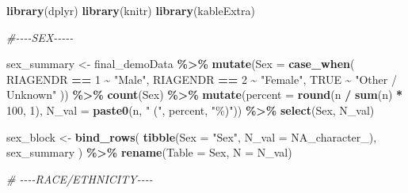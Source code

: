 \documentclass[
]{article}
\newenvironment{Shaded}{\begin{snugshade}}{\end{snugshade}}
\newcommand{\AttributeTok}[1]{\textcolor[rgb]{0.13,0.29,0.53}{#1}}
\newcommand{\CommentTok}[1]{\textcolor[rgb]{0.56,0.35,0.01}{\textit{#1}}}
\newcommand{\ConstantTok}[1]{\textcolor[rgb]{0.56,0.35,0.01}{#1}}
\newcommand{\DecValTok}[1]{\textcolor[rgb]{0.00,0.00,0.81}{#1}}
\newcommand{\FunctionTok}[1]{\textcolor[rgb]{0.13,0.29,0.53}{\textbf{#1}}}
\newcommand{\NormalTok}[1]{#1}
\newcommand{\OtherTok}[1]{\textcolor[rgb]{0.56,0.35,0.01}{#1}}
\newcommand{\SpecialCharTok}[1]{\textcolor[rgb]{0.81,0.36,0.00}{\textbf{#1}}}
\newcommand{\StringTok}[1]{\textcolor[rgb]{0.31,0.60,0.02}{#1}}
\begin{document}
\begin{Shaded}
\begin{Highlighting}[]
\FunctionTok{library}\NormalTok{(dplyr)}
\FunctionTok{library}\NormalTok{(knitr)}
\FunctionTok{library}\NormalTok{(kableExtra)}

\CommentTok{\#{-}{-}{-}{-}SEX{-}{-}{-}{-}{-}}

\NormalTok{sex\_summary }\OtherTok{\textless{}{-}}\NormalTok{ final\_demoData }\SpecialCharTok{\%\textgreater{}\%}
  \FunctionTok{mutate}\NormalTok{(}\AttributeTok{Sex =} \FunctionTok{case\_when}\NormalTok{(}
\NormalTok{    RIAGENDR }\SpecialCharTok{==} \DecValTok{1} \SpecialCharTok{\textasciitilde{}} \StringTok{"Male"}\NormalTok{,}
\NormalTok{    RIAGENDR }\SpecialCharTok{==} \DecValTok{2} \SpecialCharTok{\textasciitilde{}} \StringTok{"Female"}\NormalTok{,}
    \ConstantTok{TRUE}          \SpecialCharTok{\textasciitilde{}} \StringTok{"Other / Unknown"}
\NormalTok{  )) }\SpecialCharTok{\%\textgreater{}\%}
  \FunctionTok{count}\NormalTok{(Sex) }\SpecialCharTok{\%\textgreater{}\%}
  \FunctionTok{mutate}\NormalTok{(}\AttributeTok{percent =} \FunctionTok{round}\NormalTok{(n }\SpecialCharTok{/} \FunctionTok{sum}\NormalTok{(n) }\SpecialCharTok{*} \DecValTok{100}\NormalTok{, }\DecValTok{1}\NormalTok{), }
    \AttributeTok{N\_val =} \FunctionTok{paste0}\NormalTok{(n, }\StringTok{" ("}\NormalTok{, percent, }\StringTok{"\%)"}\NormalTok{)) }\SpecialCharTok{\%\textgreater{}\%}
  \FunctionTok{select}\NormalTok{(Sex, N\_val)}

\NormalTok{sex\_block }\OtherTok{\textless{}{-}} \FunctionTok{bind\_rows}\NormalTok{(}
  \FunctionTok{tibble}\NormalTok{(}\AttributeTok{Sex =} \StringTok{"Sex"}\NormalTok{, }\AttributeTok{N\_val =} \ConstantTok{NA\_character\_}\NormalTok{),}
\NormalTok{  sex\_summary}
\NormalTok{) }\SpecialCharTok{\%\textgreater{}\%} \FunctionTok{rename}\NormalTok{(}\AttributeTok{Table =}\NormalTok{ Sex, }\AttributeTok{N =}\NormalTok{ N\_val)}

\CommentTok{\# {-}{-}{-}{-}RACE/ETHNICITY{-}{-}{-}{-}}


\end{Highlighting}
\end{Shaded}
\end{document}
